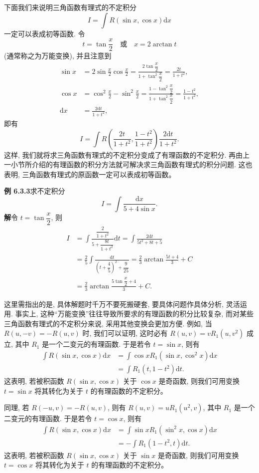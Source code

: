 \documentclass[UTF8,12pt,a4paper,fontset=fandol]{ctexart}
\begin{document}
下面我们来说明三角函数有理式的不定积分
\[
  I=\int R(\sin x,\cos x)\mathrm dx
\]
一定可以表成初等函数. 令
\[
  t=\tan\frac x2\quad\text{或}\quad x=2\arctan t
\]
(通常称之为万能变换), 并且注意到
\[
\begin{aligned}
  \sin x
  &=
  2\sin\frac x2\cos\frac x2
  =
  \frac{2\tan\dfrac x2}{1+\tan^2\dfrac x2}
  =
  \frac{2t}{1+t^2},\\
  \cos x
  &=
  \cos^2\frac x2-\sin^2\frac x2
  =
  \frac{1-\tan^2\dfrac x2}{1+\tan^2\dfrac x2}
  =
  \frac{1-t^2}{1+t^2},\\
  \mathrm dx&=\frac{2\mathrm dt}{1+t^2},
\end{aligned}
\]
即有
\[
  I=
  \int R\left(\frac{2t}{1+t^2},\frac{1-t^2}{1+t^2}\right)
  \frac{2\mathrm dt}{1+t^2}.
\]
这样, 我们就将求三角函数有理式的不定积分变成了有理函数的不定积分. 再由上一小节所介绍的有理函数的积分方法就可解决求三角函数有理式的积分问题. 这也表明, 三角函数有理式的原函数一定可以表成初等函数。

\noindent\textbf{例 6.3.3}\quad 求不定积分
\[
  I=\int\frac{\mathrm dx}{5+4\sin x}.
\]
\noindent\textbf{解}\quad 令 $t=\tan\dfrac x2$, 则
\[
\begin{aligned}
  I
  &=
  \int\frac{\dfrac2{1+t^2}}{5+\dfrac{8t}{1+t^2}}\mathrm dt
  =
  \int\frac{2\mathrm dt}{5t^2+8t+5}\\
  &=
  \frac25\int\frac{\mathrm dt}{\left(t+\dfrac45\right)^2+\dfrac9{25}}
  =
  \frac23\arctan\frac{5t+4}3+C\\
  &=
  \frac23\arctan\frac{5\tan\dfrac x2+4}3+C.
\end{aligned}
\]

这里需指出的是, 具体解题时千万不要死搬硬套, 要具体问题作具体分析, 灵活运用. 事实上, 这种``万能变换''往往导致所要求的有理函数的积分比较复杂, 而对某些三角函数有理式的不定积分来说, 采用其他变换会更加方便. 例如, 当 $R(u,-v)=-R(u,v)$ 时, 我们可以证明, 这时必有 $R(u,v)=vR_1(u,v^2)$ 成立, 其中 $R_1$ 是一个二变元的有理函数. 于是若令 $t=\sin x$, 则有
\[
\begin{aligned}
  \int R(\sin x,\cos x)\mathrm dx
  &=
  \int\cos xR_1(\sin x,\cos^2x)\mathrm dx\\
  &=
  \int R_1(t,1-t^2)\mathrm dt.
\end{aligned}
\]
这表明, 若被积函数 $R(\sin x,\cos x)$ 关于 $\cos x$ 是奇函数, 则我们可用变换 $t=\sin x$ 将其转化为关于 $t$ 的有理函数的不定积分。

同理, 若 $R(-u,v)=-R(u,v)$, 则有 $R(u,v)=uR_1(u^2,v)$, 其中 $R_1$ 是一个二变元的有理函数. 于是若令 $t=\cos x$, 则有
\[
\begin{aligned}
  \int R(\sin x,\cos x)\mathrm dx
  &=
  \int\sin xR_1(\sin^2x,\cos x)\mathrm dx\\
  &=
  -\int R_1(1-t^2,t)\mathrm dt.
\end{aligned}
\]
这表明, 若被积函数 $R(\sin x,\cos x)$ 关于 $\sin x$ 是奇函数, 则我们可用变换 $t=\cos x$ 将其转化为关于 $t$ 的有理函数的不定积分。
\end{document}
